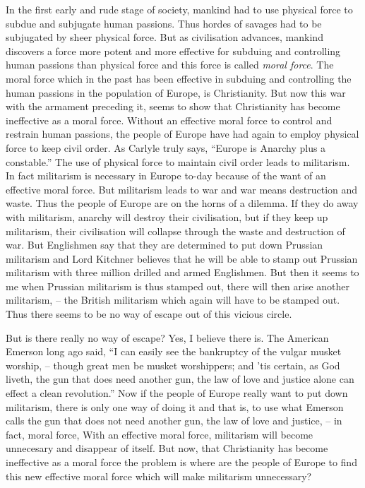 In the first early and rude stage of society, mankind had to use
physical force to subdue and subjugate human passions.
Thus hordes of savages had to be subjugated by sheer physical force.
But as civilisation advances, mankind discovers a force more potent and more effective for subduing and controlling human passions than physical force and this force is called \emph{moral force}.
The moral force which in the past has been effective in subduing
and controlling the human passions in the population of Europe, is Christianity.
But now this war with the armament preceding it,
seems to show that Christianity has become ineffective as a moral force.
Without an effective moral force to control and restrain human passions,
the people of Europe have had again to employ physical force to keep civil order.
As Carlyle truly says, ``Europe is Anarchy plus a constable.''
The use of physical force to maintain civil order leads to militarism. In fact militarism is necessary in Europe to-day
because of the want of an effective moral force. But militarism leads to war and war means destruction and waste. Thus the people of Europe are on the horns of a dilemma.
If they do away with militarism, anarchy will destroy their civilisation,
but if they keep up militarism,
their civilisation will collapse through the waste and destruction of war.
But Englishmen say that they are determined to put down Prussian militarism and Lord Kitchner believes
that he will be able to stamp out Prussian militarism with three million drilled and armed Englishmen.
But then it seems to me when Prussian militarism is thus stamped out,
there will then arise another militarism,
-- the British militarism which again will have to be stamped out.
Thus there seems to be no way of escape out of this vicious circle.

But is there really no way of escape? Yes, I believe there is. The American Emerson long ago said,
``I can easily see the bankruptcy of the vulgar musket worship, -- though great men be musket worshippers; and 'tis certain,
as God liveth, the gun that does need another gun, the law of love and justice alone can effect a clean revolution.''
Now if the people of Europe really want to put down militarism, there is only one way of doing it and that is,
to use what Emerson calls the gun that does not need another gun, the law of love and justice, -- in fact, moral force, 
With an effective moral force, militarism will become unnecesary and disappear of itself.
But now, that Christianity has become ineffective as a moral force the problem is
where are the people of Europe to find this new effective moral force which will make militarism unnecessary?

